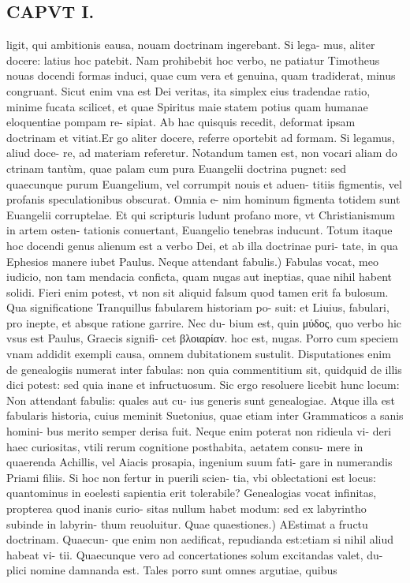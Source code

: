 \documentclass{article}
\begin{document}
\begin{pages}
\section*{CAPVT I. }
\marginpar{[ p.3 ]}\pstart ligit, qui ambitionis eausa, nouam doctrinam ingerebant. Si lega- mus, aliter docere: latius hoc patebit. Nam prohibebit hoc verbo, ne patiatur Timotheus nouas docendi formas induci, quae cum vera et genuina, quam tradiderat, minus congruant. Sicut enim vna est Dei veritas, ita simplex eius tradendae ratio, minime fucata scilicet, et quae Spiritus maie statem potius quam humanae eloquentiae pompam re- sipiat. Ab hac quisquis recedit, deformat ipsam doctrinam et vitiat.Er go aliter docere, referre oportebit ad formam. Si legamus, aliud doce- re, ad materiam referetur. Notandum tamen est, non vocari aliam do ctrinam tantùm, quae palam cum pura Euangelii doctrina pugnet: sed quaecunque purum Euangelium, vel corrumpit nouis et aduen- titiis figmentis, vel profanis speculationibus obscurat. Omnia e- nim hominum figmenta totidem sunt Euangelii corruptelae. Et qui scripturis ludunt profano more, vt Christianismum in artem osten- tationis conuertant, Euangelio tenebras inducunt. Totum itaque hoc docendi genus alienum est a verbo Dei, et ab illa doctrinae puri- tate, in qua Ephesios manere iubet Paulus.  \pend\pstart Neque attendant fabulis.) Fabulas vocat, meo iudicio, non tam mendacia conficta, quam nugas aut ineptias, quae nihil habent solidi. Fieri enim potest, vt non sit aliquid falsum quod tamen erit fa bulosum. Qua significatione Tranquillus fabularem historiam po- suit: et Liuius, fabulari, pro inepte, et absque ratione garrire. Nec du- bium est, quin μύδος, quo verbo hic vsus est Paulus, Graecis signifi- cet βλοιαρίαν. hoc est, nugas. Porro cum speciem vnam addidit exempli causa, omnem dubitationem sustulit. Disputationes enim de genealogiis numerat inter fabulas: non quia commentitium sit, quidquid de illis dici potest: sed quia inane et infructuosum. Sic ergo resoluere licebit hunc locum: Non attendant fabulis: quales aut cu- ius generis sunt genealogiae. Atque illa est fabularis historia, cuius meminit Suetonius, quae etiam inter Grammaticos a sanis homini- bus merito semper derisa fuit. Neque enim poterat non ridieula vi- deri haec curiositas, vtili rerum cognitione posthabita, aetatem consu- mere in quaerenda Achillis, vel Aiacis prosapia, ingenium suum fati- gare in numerandis Priami filiis. Si hoc non fertur in puerili scien- tia, vbi oblectationi est locus: quantominus in eoelesti sapientia erit tolerabile? Genealogias vocat infinitas, propterea quod inanis curio- sitas nullum habet modum: sed ex labyrintho subinde in labyrin- thum reuoluitur.  \pend\pstart Quae quaestiones.) AEstimat a fructu doctrinam. Quaecun- que enim non aedificat, repudianda est:etiam si nihil aliud habeat vi- tii. Quaecunque vero ad concertationes solum excitandas valet, du- plici nomine damnanda est. Tales porro sunt omnes argutiae, quibus  \pend

\end{pages}
\end{document}
